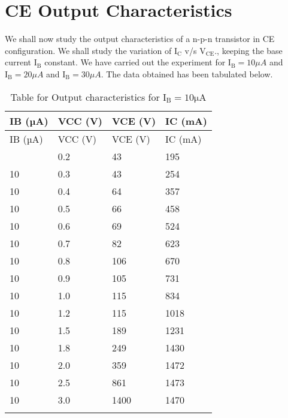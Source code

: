 \documentclass[12pt]{article}
\begin{document}
\section{CE Output Characteristics}
We shall now study the output characteristics of a n-p-n transistor in CE configuration. We shall study the variation of $\mathrm{I_C}$ v/s $\mathrm{V_{CE}}$., keeping the base current $\mathrm{I_B}$ constant. We have carried out the experiment for $\mathrm{I_B}=10 \mu A$ and $\mathrm{I_B}=20 \mu A$ and $\mathrm{I_B}= 30 \mu A$. The data obtained has been tabulated below.
\begin{longtable}{|l|l|l|l|}
	\hline
    IB (µA) & VCC (V) & VCE (V) & IC (mA) \\ \hline
	\endfirsthead
	\hline
    IB (µA) & VCC (V) & VCE (V) & IC (mA) \\ \hline
	\endhead
	\hline
	\endfoot
	\endlastfoot
    10  & 0.2  & 43   & 195  \\ \hline
    10  & 0.3  & 43   & 254  \\ \hline
    10  & 0.4  & 64   & 357  \\ \hline
    10  & 0.5  & 66   & 458  \\ \hline
    10  & 0.6  & 69   & 524  \\ \hline
    10  & 0.7  & 82   & 623  \\ \hline
    10  & 0.8  & 106  & 670  \\ \hline
    10  & 0.9  & 105  & 731  \\ \hline
    10  & 1.0  & 115  & 834  \\ \hline
    10  & 1.2  & 115  & 1018 \\ \hline
    10  & 1.5  & 189  & 1231 \\ \hline
    10  & 1.8  & 249  & 1430 \\ \hline
    10  & 2.0  & 359  & 1472 \\ \hline
    10  & 2.5  & 861  & 1473 \\ \hline
    10  & 3.0  & 1400 & 1470 \\ \hline
\caption{Table for Output characteristics for $\mathrm{I_B=10 \mu A}$}
\end{longtable}
\end{document}
